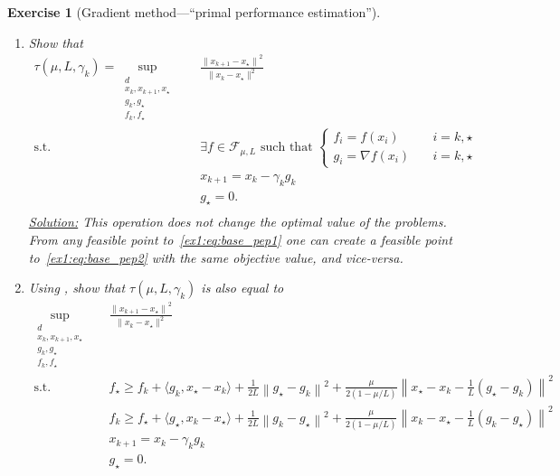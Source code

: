 \documentclass[11pt,a4paper]{article}
\newcommand{\normsq}[1]{{\left\lVert#1\right\rVert}^2}
\newcommand{\inner}[2]{{\langle #1, #2\rangle}}
\DeclareMathOperator*{\argmin}{argmin}
\newcommand{\correction}[1]{{{\color{blue}\underline{Solution:} #1}}}
\newcommand{\correction}[1]{}
\newtheorem{exercise}{Exercise}
\begin{document}
\begin{exercise}[Gradient method---``primal performance estimation'']
\begin{enumerate}
	\correction{We trivially have~\eqref{ex1:eq:distance} $\Leftrightarrow \frac{\|x_{k+1}-x_\star\|^2}{\|x_k-x_\star\|^2}\leqslant \tau(\mu,L,\gamma_k)$ for any $d\in\mathbb{N}$, for any $f\in\mathcal{F}_{\mu,L}$, and for all $x_k,x_{k+1}\in\mathbb{R}^d$ such that $x_{k+1}=x_k-\gamma_k \nabla f(x_k)$, and $x_\star\in\argmin_x f(x)$ (with $x_\star\neq x_k$). It trivially follows that $\tau(\mu,L,\gamma_k)$ upper bounds the RHS of~\eqref{ex1:eq:base_pep1}.
	By definition of~\eqref{ex1:eq:distance}, this is even the smallest one, hence the equality.
	}
	\item Show that
	\begin{equation}\label{ex1:eq:base_pep2}
		\begin{aligned}
		\tau(\mu,L,\gamma_k)=\sup_{\substack{d\\x_k,x_{k+1},x_\star\\g_k,g_\star\\f_k,f_\star}} \quad & \frac{{\|x_{k+1}-x_\star\|}^2}{\|x_k-x_\star\|^2}\\
		\text{s.t. } & \exists f\in\mathcal{F}_{\mu,L} \text{ such that }\left\{\begin{array}{ll}
			f_i=f(x_i)\quad & i=k,\star\\
			g_i=\nabla f(x_i)\quad & i=k,\star
			\end{array}\right.\\
		& x_{k+1}=x_k-\gamma_k  g_k\\
		& g_\star=0.\\
		\end{aligned}
		\end{equation}
	\correction{This operation does not change the optimal value of the problems. From any feasible point to~\eqref{ex1:eq:base_pep1} one can create a feasible point to~\eqref{ex1:eq:base_pep2} with the same objective value, and vice-versa.}
	
	\item Using , show that $\tau(\mu,L,\gamma_k)$ is also equal to
	\begin{equation}\label{ex1:eq:base_pep3}
		\begin{aligned}
		\sup_{\substack{d\\x_k,x_{k+1},x_\star\\g_k,g_\star\\f_k,f_\star}} \quad & \frac{{\|x_{k+1}-x_\star\|}^2}{\|x_k-x_\star\|^2}\\
		\text{s.t. } & f_\star\geqslant f_k+\inner{g_k}{x_\star-x_k}+\tfrac{1}{2L}\normsq{g_\star-g_k}+\tfrac{\mu}{2(1-\mu/L)}\normsq{x_\star-x_k-\tfrac{1}{L}(g_\star-g_k)}\\
			&f_k\geqslant f_\star+\inner{g_\star}{x_k-x_\star}+\tfrac{1}{2L}\normsq{g_k-g_\star}+\tfrac{\mu}{2(1-\mu/L)}\normsq{x_k-x_\star-\tfrac{1}{L}(g_k-g_\star)}\\
		& x_{k+1}=x_k-\gamma_k  g_k\\
		& g_\star=0.\\
		\end{aligned}
		\end{equation}
		

\end{enumerate}
\end{exercise}
\end{document}
